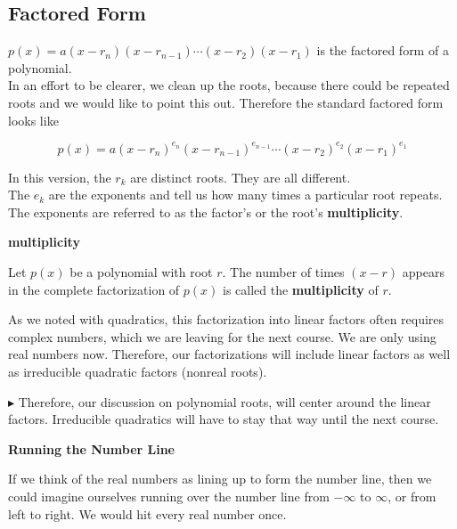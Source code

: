 \documentclass{ximera}
\begin{document}
\subsection*{Factored Form}


$p(x) = a (x-r_n)(x-r_{n-1})  \cdots (x-r_2)(x-r_1)$ is the factored form of a polynomial.  \\

In an effort to be clearer, we clean up the roots, because there could be repeated roots and we would like to point this out.  Therefore the standard factored form looks like




\[   p(x) = a (x-r_n)^{e_n} (x-r_{n-1})^{e_{n-1}}  \cdots (x-r_2)^{e_2} (x-r_1)^{e_1}  \]



In this version, the $r_k$ are distinct roots.  They are all different. \\
The $e_k$ are the exponents and tell us how many times a particular root repeats.  The exponents are referred to as the factor's or the root's \textbf{multiplicity}.\\




\begin{definition} \textbf{\textcolor{green!50!black}{multiplicity}} 

Let $p(x)$ be a polynomial with root $r$.  The number of times $(x - r)$ appears in the complete factorization of $p(x)$ is called the \textbf{multiplicity} of $r$.

\end{definition}

As we noted with quadratics, this factorization into linear factors often requires complex numbers, which we are leaving for the next course. We are only using real numbers now.  Therefore, our factorizations will include linear factors as well as irreducible quadratic factors (nonreal roots).

\textbf{\textcolor{red!90!darkgray}{$\blacktriangleright$}}  Therefore, our discussion on polynomial roots, will center around the linear factors.  Irreducible quadratics will have to stay that way until the next course.










\textbf{\large Running the Number Line}

If we think of the real numbers as lining up to form the number line, then we could imagine ourselves running over the number line from $-\infty$ to $\infty$, or from left to right.  We would hit every real number once.  \\
\end{document}
